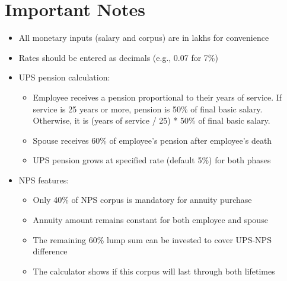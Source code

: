 \documentclass{article}
\begin{document}
\section{Important Notes}
\begin{itemize}
    \item All monetary inputs (salary and corpus) are in lakhs for convenience
    \item Rates should be entered as decimals (e.g., 0.07 for 7\%)
    \item UPS pension calculation:
    \begin{itemize}
        \item Employee receives a pension proportional to their years of service. If service is 25 years or more, pension is 50\% of final basic salary. Otherwise, it is (years of service / 25) * 50\% of final basic salary.
        \item Spouse receives 60\% of employee's pension after employee's death
        \item UPS pension grows at specified rate (default 5\%) for both phases
    \end{itemize}
    \item NPS features:
    \begin{itemize}
        \item Only 40\% of NPS corpus is mandatory for annuity purchase
        \item Annuity amount remains constant for both employee and spouse
        \item The remaining 60\% lump sum can be invested to cover UPS-NPS difference
        \item The calculator shows if this corpus will last through both lifetimes
    \end{itemize}
\end{itemize}
\end{document}
